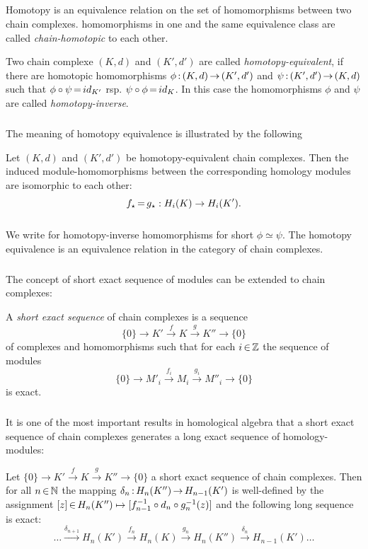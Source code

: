 \documentclass[11pt,twoside]{article}
\begin{document}
\subparagraph{}
Homotopy is an equivalence relation on the set of homomorphisms 
between two chain complexes.
homomorphisms in one and the same equivalence class are called
\textit{chain-homotopic} to each other.

\begin{definition}
Two chain complexe $(K,d)$ and $(K',d')$ are called \textit{homotopy-equivalent},
if there are homotopic homomorphisms
$\phi {\,:\,} (K,d)   {\,\to\,} (K',d')$ and 
$\psi {\,:\,} (K',d') {\,\to\,} (K,d)$
such that
$\phi \circ \psi {\,=\,} id_{K'}$ rsp. $\psi \circ \phi {\,=\,} id_K$.
In this case the homomorphisms $\phi$ and $\psi$ are called
\textit{homotopy-inverse}.
\end{definition}

\subparagraph{}
The meaning of homotopy equivalence is illustrated by the following

\begin{theorem1}
Let $(K,d)$ and $(K',d')$ be homotopy-equivalent chain complexes.
Then the induced module-homomorphisms between the corresponding
homology modules are isomorphic to each other:
\[
f_{\star} {\,=\,} g_{\star} : H_i(K) \to H_i(K').
\]
\end{theorem1}

\subparagraph{}
We write for homotopy-inverse homomorphisms for short $\phi \simeq \psi$.
The homotopy equivalence is an equivalence relation
in the category of chain complexes.

\subparagraph{}
The concept of short exact sequence of modules can be extended to chain complexes:

\begin{definition}
A \textit{short exact sequence} of chain complexes is a sequence
\[
\{0\} 
\longrightarrow K' 
\stackrel{f}{\longrightarrow} K 
\stackrel{g}{\longrightarrow} K''
\longrightarrow 
\{0\}
\]
of complexes and homomorphisms
such that for each $i {\,\in\,} {\mathbb{Z}}$ the sequence of modules
\[
\{0\} \longrightarrow M'_i 
      \stackrel{f_i}{\longrightarrow} M_i 
      \stackrel{g_i}{\longrightarrow} M''_i 
      \longrightarrow
\{0\}
\]
is exact.
\end{definition}

\subparagraph{}
It is one of the most important results in homological algebra
that a short exact sequence of chain complexes
generates a long exact sequence of homology-modules:

\begin{theorem1}
Let
$
\{0\} 
\longrightarrow K' 
\stackrel{f}{\longrightarrow} K 
\stackrel{g}{\longrightarrow} K''
\longrightarrow 
\{0\}
$
a short exact sequence of chain complexes.
Then for all $n {\,\in\,} {\mathbb{N}}$ the mapping
$\delta_n {\,:\,} H_n(K'') {\,\to\,} H_{n-1}(K')$ is well-defined by the assignment
$[z] {\,\in\,} H_n(K'') \mapsto [ f^{-1}_{n-1} \circ d_n \circ g^{-1}_n(z) ]$
and the following long sequence is exact:
\[
\ldots 
       \stackrel{\delta_{n+1}}{\longrightarrow} H_n(K')
       \stackrel{ f_n}        {\longrightarrow} H_n(K)
       \stackrel{ g_n}        {\longrightarrow} H_n(K'')
       \stackrel{\delta_n}    {\longrightarrow} H_{n-1}(K')
\ldots
\]
\end{theorem1}
\end{document}
